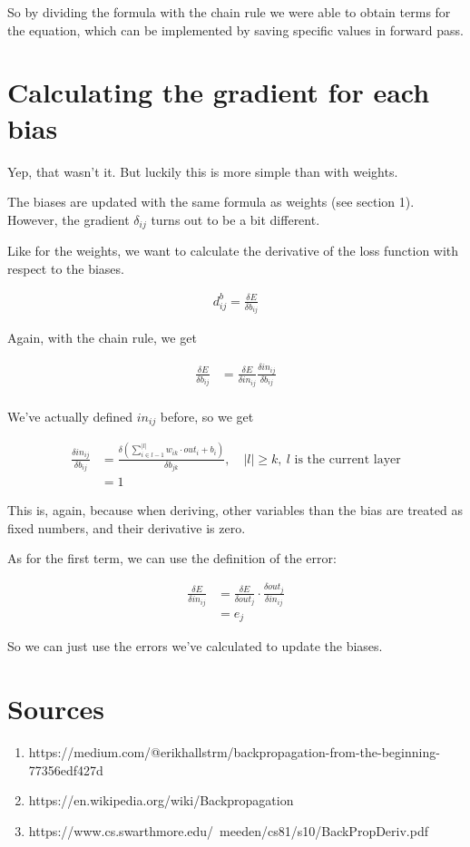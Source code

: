 \documentclass[a4paper, 12pt, finnish]{article}
\begin{document}
So by dividing the formula with the chain rule we were able to obtain terms for the equation, which can be implemented by saving specific values in forward pass.


\section{Calculating the gradient for each bias}
Yep, that wasn't it. But luckily this is more simple than with weights.

The biases are updated with the same formula as weights (see section 1). However, the gradient $\delta_{ij}$ turns out to be a bit different.

Like for the weights, we want to calculate the derivative of the loss function with respect to the biases.

\begin{align*}
  d^b_{ij} = \frac{\delta E}{\delta b_{ij}}
\end{align*}

Again, with the chain rule, we get

\begin{align*}
  \frac{\delta E}{\delta b_{ij}} &= \frac{\delta E}{\delta in_{ij}} \frac{\delta in_{ij}}{\delta b_{ij}} \\
\end{align*}

We've actually defined $in_{ij}$ before, so we get

\begin{align*}
  \frac{\delta in_{ij}}{\delta b_{ij}}  &= \frac{\delta \left(\sum^{|l|}_{i \in l-1} w_{ik}\cdot out_i + b_{i}\right)}{\delta b_{jk}}, \quad |l| \geq k, \> l \text{ is the current layer} \\
  &= 1
\end{align*}

This is, again, because when deriving, other variables than the bias are treated as fixed numbers, and their derivative is zero.

As for the first term, we can use the definition of the error:

\begin{align*}
  \frac{\delta E}{\delta in_{ij}} &= \frac{\delta E}{\delta out_j} \cdot \frac{\delta out_j}{\delta in_{ij}} \\
  &=  e_j
\end{align*}

So we can just use the errors we've calculated to update the biases.

\section{Sources}

\begin{enumerate}
  \item https://medium.com/@erikhallstrm/backpropagation-from-the-beginning-77356edf427d
  \item https://en.wikipedia.org/wiki/Backpropagation
  \item https://www.cs.swarthmore.edu/~meeden/cs81/s10/BackPropDeriv.pdf
\end{enumerate}
\end{document}
